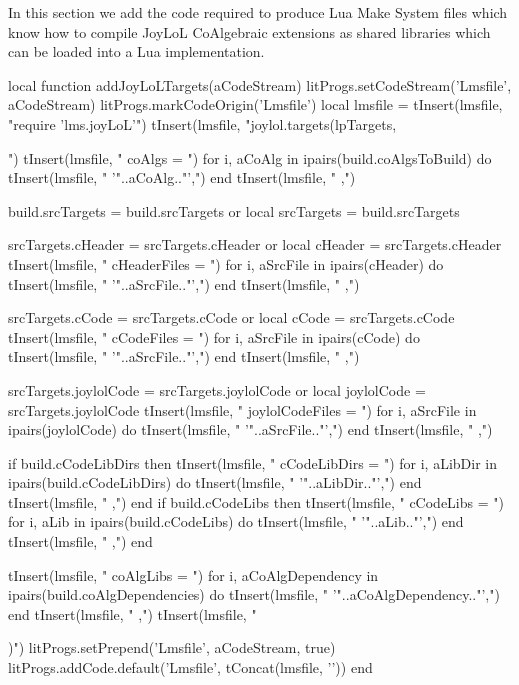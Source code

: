 In this section we add the code required to produce Lua Make System files 
which know how to compile JoyLoL CoAlgebraic extensions as shared 
libraries which can be loaded into a Lua implementation. 

\startMkIVCode
\def\addJoyLoLTargets#1{
  \directlua{
    thirddata.joylolCoAlgs.addJoyLoLTargets('#1')
  }
}
\stopMkIVCode

\startLuaCode
local function addJoyLoLTargets(aCodeStream)
  litProgs.setCodeStream('Lmsfile', aCodeStream)
  litProgs.markCodeOrigin('Lmsfile')
  local lmsfile = {}
  tInsert(lmsfile, "require 'lms.joyLoL'\n")
  tInsert(lmsfile, "joylol.targets(lpTargets, {")
  tInsert(lmsfile, "  coAlgs = {")
  for i, aCoAlg in ipairs(build.coAlgsToBuild) do
    tInsert(lmsfile, "    '"..aCoAlg.."',")
  end
  tInsert(lmsfile, "  },")
  
  build.srcTargets = build.srcTargets or { }
  local srcTargets = build.srcTargets
  
  srcTargets.cHeader = srcTargets.cHeader or { }
  local cHeader      = srcTargets.cHeader
  tInsert(lmsfile, "  cHeaderFiles = {")
  for i, aSrcFile in ipairs(cHeader) do
    tInsert(lmsfile, "    '"..aSrcFile.."',")
  end
  tInsert(lmsfile, "  },")
  
  srcTargets.cCode = srcTargets.cCode or { }
  local cCode      = srcTargets.cCode
  tInsert(lmsfile, "  cCodeFiles = {")
  for i, aSrcFile in ipairs(cCode) do
    tInsert(lmsfile, "    '"..aSrcFile.."',")
  end
  tInsert(lmsfile, "  },")

  srcTargets.joylolCode = srcTargets.joylolCode or { }
  local joylolCode      = srcTargets.joylolCode
  tInsert(lmsfile, "  joylolCodeFiles = {")
  for i, aSrcFile in ipairs(joylolCode) do
    tInsert(lmsfile, "    '"..aSrcFile.."',")
  end
  tInsert(lmsfile, "  },")

  if build.cCodeLibDirs then 
    tInsert(lmsfile, "  cCodeLibDirs = {")
    for i, aLibDir in ipairs(build.cCodeLibDirs) do
      tInsert(lmsfile, "    '"..aLibDir.."',")
    end
    tInsert(lmsfile, "  },")
  end
  if build.cCodeLibs then 
    tInsert(lmsfile, "  cCodeLibs = {")
    for i, aLib in ipairs(build.cCodeLibs) do
      tInsert(lmsfile, "    '"..aLib.."',")
    end
    tInsert(lmsfile, "  },")
  end

  tInsert(lmsfile, "  coAlgLibs = {")
  for i, aCoAlgDependency in ipairs(build.coAlgDependencies) do
    tInsert(lmsfile, "    '"..aCoAlgDependency.."',")
  end
  tInsert(lmsfile, "  },")
  tInsert(lmsfile, "})")
  litProgs.setPrepend('Lmsfile', aCodeStream, true)
  litProgs.addCode.default('Lmsfile', tConcat(lmsfile, '\n'))
end

